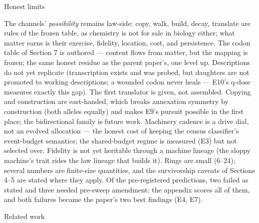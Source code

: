 \sec Honest limits

The channels' {\it possibility} remains law-side: copy, walk,
build, decay, translate are rules of the frozen table, as
chemistry is not for sale in biology either; what matter earns is
their exercise, fidelity, location, cost, and persistence. The
codon table of Section 7 is authored --- content flows from
matter, but the mapping is frozen; the same honest residue as the
parent paper's, one level up. Descriptions do not yet replicate
(transcription exists and was probed, but daughters are not
promoted to working descriptions; a wounded codon never heals ---
E10's q-dose measures exactly this gap). The first translator is
given, not assembled. Copying and construction are east-handed,
which breaks annexation symmetry by construction (both alleles
equally) and makes E9's pursuit possible in the first place; the
bidirectional family is future work. Machinery cadence is a drive
dial, not an evolved allocation --- the honest cost of keeping
the census classifier's event-budget semantics; the shared-budget
regime is measured (E3) but not selected over. Fidelity is not
yet heritable through a machine lineage (the sloppy machine's
trait rides the law lineage that builds it). Rings are small
(6--24); several numbers are finite-size quantities, and the
survivorship caveats of Sections 4--5 are stated where they
apply. Of the pre-registered predictions, two failed as stated
and three needed pre-sweep amendment; the appendix scores all of
them, and both failures became the paper's two best findings
(E4, E7).

\sec Related work

